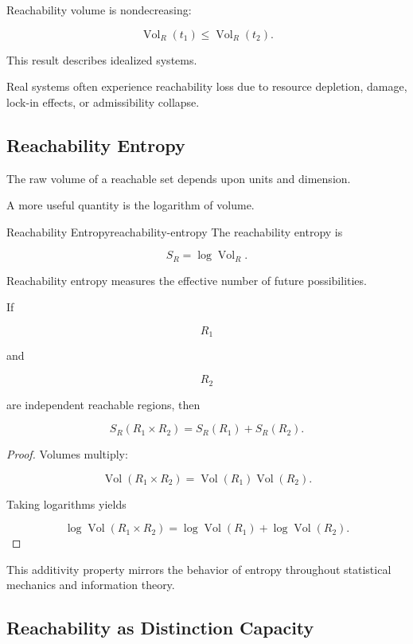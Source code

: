 \documentclass[12pt,twoside,openright]{book}
\newenvironment{prop}
{\begin{proposition}{}{}}
{\end{proposition}}
\newcommand{\Vol}{\operatorname{Vol}}
\begin{document}
\begin{corollary}
Reachability volume is nondecreasing:

\[
\Vol_R(t_1)
\le
\Vol_R(t_2).
\]
\end{corollary}

This result describes idealized systems.

Real systems often experience reachability loss due to
resource depletion, damage, lock-in effects, or
admissibility collapse.

\subsection{Reachability Entropy}

The raw volume of a reachable set depends upon units and
dimension.

A more useful quantity is the logarithm of volume.

\begin{definition}{Reachability Entropy}{reachability-entropy}
The reachability entropy is

\[
S_R
=

\log\Vol_R.
\]
\end{definition}

Reachability entropy measures the effective number of
future possibilities.

\begin{prop}
If

\[
R_1
\]

and

\[
R_2
\]

are independent reachable regions, then

\[
S_R(R_1\times R_2)
=

S_R(R_1)
+
S_R(R_2).
\]
\end{prop}

\begin{proof}
Volumes multiply:

\[
\Vol(R_1\times R_2)
=

\Vol(R_1)\Vol(R_2).
\]

Taking logarithms yields

\[
\log
\Vol(R_1\times R_2)
=

\log\Vol(R_1)
+
\log\Vol(R_2).
\]
\end{proof}

This additivity property mirrors the behavior of entropy
throughout statistical mechanics and information theory.

\subsection{Reachability as Distinction Capacity}
\end{document}
